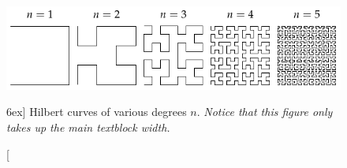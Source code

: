
\begin{figure}[h!]%
  \includegraphics{fg-tufte-normal-hilbertcurves}
  \caption[Example file fg-tufte-normal-hilbertcurves.tex][6ex]
  {Hilbert curves of various degrees $n$. 
  \emph{Notice that this figure only takes up the main textblock width.}}
  \label{fg-tufte-normal-hilbertcurves}
\end{figure}